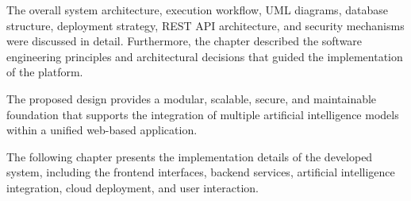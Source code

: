 The overall system architecture, execution workflow, UML diagrams, database structure, deployment strategy, REST API architecture, and security mechanisms were discussed in detail. Furthermore, the chapter described the software engineering principles and architectural decisions that guided the implementation of the platform.

The proposed design provides a modular, scalable, secure, and maintainable foundation that supports the integration of multiple artificial intelligence models within a unified web-based application.

The following chapter presents the implementation details of the developed system, including the frontend interfaces, backend services, artificial intelligence integration, cloud deployment, and user interaction.
